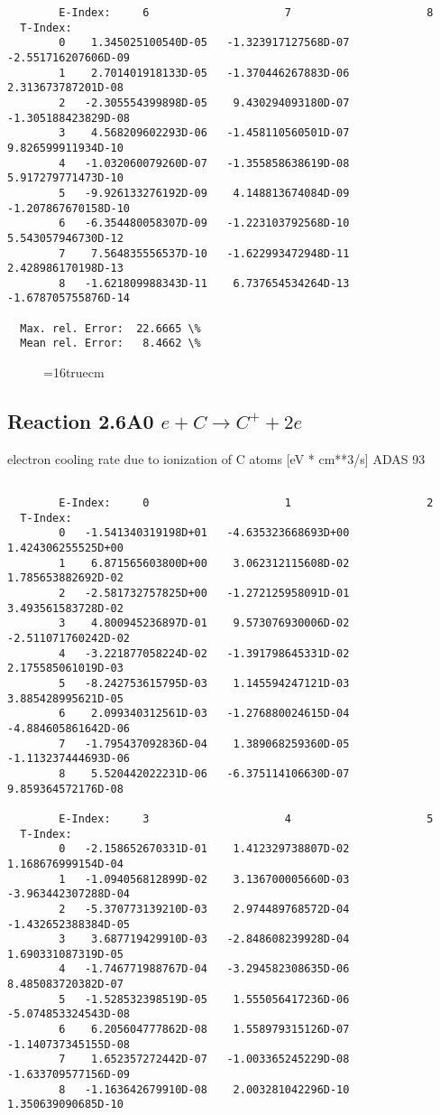 \documentclass[12pt,dvipdfmx]{article}
\begin{document}
{\begin{small}
\begin{verbatim}
        E-Index:     6                     7                     8
  T-Index:
        0    1.345025100540D-05   -1.323917127568D-07   -2.551716207606D-09
        1    2.701401918133D-05   -1.370446267883D-06    2.313673787201D-08
        2   -2.305554399898D-05    9.430294093180D-07   -1.305188423829D-08
        3    4.568209602293D-06   -1.458110560501D-07    9.826599911934D-10
        4   -1.032060079260D-07   -1.355858638619D-08    5.917279771473D-10
        5   -9.926133276192D-09    4.148813674084D-09   -1.207867670158D-10
        6   -6.354480058307D-09   -1.223103792568D-10    5.543057946730D-12
        7    7.564835556537D-10   -1.622993472948D-11    2.428986170198D-13
        8   -1.621809988343D-11    6.737654534264D-13   -1.678705755876D-14

  Max. rel. Error:  22.6665 \%
  Mean rel. Error:   8.4662 \%
\end{verbatim}\end{small}
\begin{figure} \label{2.3.13aer}
\epsfxsize=16truecm
\end{figure}
\newpage

\subsection{
  Reaction 2.6A0  $e + C  \rightarrow C^+   + 2e $
}
electron cooling rate due to ionization of C atoms [eV * cm**3/s]
ADAS 93

\begin{small}\begin{verbatim}

        E-Index:     0                     1                     2
  T-Index:
        0   -1.541340319198D+01   -4.635323668693D+00    1.424306255525D+00
        1    6.871565603800D+00    3.062312115608D-02    1.785653882692D-02
        2   -2.581732757825D+00   -1.272125958091D-01    3.493561583728D-02
        3    4.800945236897D-01    9.573076930006D-02   -2.511071760242D-02
        4   -3.221877058224D-02   -1.391798645331D-02    2.175585061019D-03
        5   -8.242753615795D-03    1.145594247121D-03    3.885428995621D-05
        6    2.099340312561D-03   -1.276880024615D-04   -4.884605861642D-06
        7   -1.795437092836D-04    1.389068259360D-05   -1.113237444693D-06
        8    5.520442022231D-06   -6.375114106630D-07    9.859364572176D-08

        E-Index:     3                     4                     5
  T-Index:
        0   -2.158652670331D-01    1.412329738807D-02    1.168676999154D-04
        1   -1.094056812899D-02    3.136700005660D-03   -3.963442307288D-04
        2   -5.370773139210D-03    2.974489768572D-04   -1.432652388384D-05
        3    3.687719429910D-03   -2.848608239928D-04    1.690331087319D-05
        4   -1.746771988767D-04   -3.294582308635D-06    8.485083720382D-07
        5   -1.528532398519D-05    1.555056417236D-06   -5.074853324543D-08
        6    6.205604777862D-08    1.558979315126D-07   -1.140737345155D-08
        7    1.652357272442D-07   -1.003365245229D-08   -1.633709577156D-09
        8   -1.163642679910D-08    2.003281042296D-10    1.350639090685D-10


\end{verbatim}
\end{small}}
\end{document}
